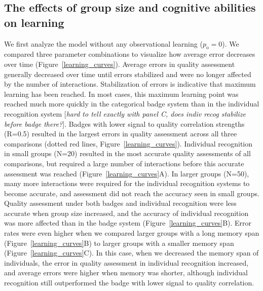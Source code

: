 \subsection*{The effects of group size and cognitive abilities on learning }
We first analyze the model without any observational learning ($p_\text{o}=0$). We compared three parameter combinations to visualize how average error decreases over time (Figure~\ref{learning_curves}). Average errors in quality assessment generally decreased over time until errors stabilized and were no longer affected by the number of interactions. Stabilization of errors is indicative that maximum learning has been reached. In most cases, this maximum learning point was reached much more quickly in the categorical badge system than in the individual recognition system [\textit{hard to tell exactly with panel C, does indiv recog stabilize before badge there?}]. Badges with lower signal to quality correlation strengths (R=0.5) resulted in the largest errors in quality assessment across all three comparisons (dotted red lines, Figure~\ref{learning_curves}). Individual recognition in small groups (N=20) resulted in the most accurate quality assessments of all comparisons, but required a large number of interactions before this accurate assessment was reached (Figure~\ref{learning_curves}A). In larger groups (N=50), many more interactions were required for the individual recognition systems to become accurate, and assessment did not reach the accuracy seen in small groups. Quality assessment under both badges and individual recognition were less accurate when group size increased, and the accuracy of individual recognition was more affected than in the badge system (Figure~\ref{learning_curves}B). Error rates were even higher when we compared larger groups with a long memory span (Figure~\ref{learning_curves}B) to larger groups with a smaller memory span (Figure~\ref{learning_curves}C). In this case, when we decreased the memory span of individuals, the error in quality assessment in individual recognition increased, and average errors were higher when memory was shorter, although individual recognition still outperformed the badge with lower signal to quality correlation. 

